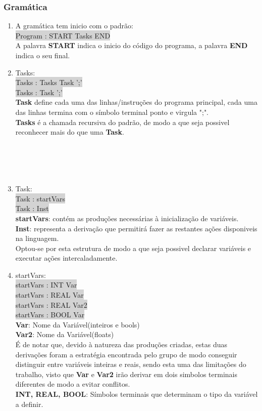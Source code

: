 \documentclass{report}
\begin{document}
\subsubsection{Gramática}
\begin{enumerate}
\item A gramática tem inicio com o padrão:\\
\colorbox{lightgray}{Program : START Tasks END}\\
A palavra \textbf{START} indica o inicio do código do programa, a palavra \textbf{END} indica o seu final.

\item Tasks:\\
\colorbox{lightgray}{Tasks : Tasks Task ';'}\\
\colorbox{lightgray}{Tasks :  Task ';'}\\
\textbf{Task} define cada uma das linhas/instruções do programa principal, cada uma das linhas termina com o símbolo terminal ponto e virgula  ";".\\
\textbf{Tasks} é a chamada recursiva do padrão, de modo a que seja possivel reconhecer mais do que uma \textbf{Task}.\\
\\
\\
\\
\\

\item Task:\\
\colorbox{lightgray}{Task : startVars}\\
\colorbox{lightgray}{Task : Inst}\\
\textbf{startVars}: contém as produções necessárias à inicialização de variáveis.\\
\textbf{Inst}:																																																																																																											 representa a derivação que permitirá fazer as restantes ações disponiveis na linguagem.\\
Optou-se por esta estrutura de modo a que seja possivel declarar variáveis e executar ações intercaladamente.

\item startVars:\\
\colorbox{lightgray}{startVars : INT Var}\\
\colorbox{lightgray}{startVars : REAL Var}\\
\colorbox{lightgray}{startVars : REAL Var2}\\
\colorbox{lightgray}{startVars : BOOL Var}\\
\textbf{Var}: Nome da Variável(inteiros e bools)\\
\textbf{Var2}: Nome da Variável(floats)\\
É de notar que, devido à natureza das produções criadas, estas duas derivações foram a estratégia encontrada pelo grupo de modo conseguir distinguir entre variáveis inteiras e reais, sendo esta uma das limitações do trabalho, visto que \textbf{Var} e \textbf{Var2} irão derivar em dois simbolos terminais diferentes de modo a evitar conflitos.\\
\textbf{INT, REAL, BOOL}: Símbolos terminais que determinam o tipo da variável a definir.\\


\end{enumerate}
\end{document}
